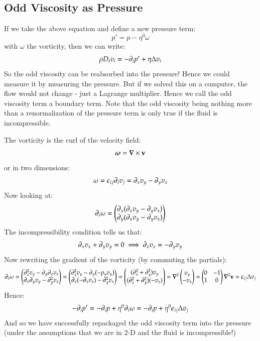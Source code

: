 \subsection{Odd Viscosity as Pressure}
If we take the above equation and define a new pressure term:
\begin{equation}
    p' = p - \eta^0\omega
\end{equation}
with $\omega$ the vorticity, then we can write:
\begin{equation}
    \rho D_t v_i = -\partial_i p' + \eta \Delta v_i
\end{equation}
So the odd viscosity can be reabsorbed into the pressure! Hence we could measure it by measuring the pressure. But if we solved this on a computer, the flow would not change - just a Lagrange multiplier. Hence we call the odd viscosity term a boundary term. Note that the odd viscosity being nothing more than a renormalization of the pressure term is only true if the fluid is incompressible.

The vorticity is the curl of the velocity field:
\begin{equation}
    \gv{\omega} = \nabla \times \v{v}
\end{equation}
or in two dimensions:
\begin{equation}
    \omega = \epsilon_{ij}\partial_i v_j = \partial_x v_y - \partial_y v_x
\end{equation}
Now looking at:
\begin{equation}
    \partial_i \omega = \begin{pmatrix}\partial_x(\partial_x v_y - \partial_y v_x) \\ \partial_y(\partial_x v_y - \partial_y v_x)\end{pmatrix}
\end{equation}
The incompressibility condition tells us that:
\begin{equation}
    \partial_x v_x + \partial_y v_y = 0 \implies \partial_x v_x = -\partial_y v_y
\end{equation}
Now rewriting the gradient of the vorticity (by commuting the partials):
\begin{equation}
    \p_i \omega = \m{\p_x^2 v_y - \p_y \p_x v_x  \\ \p_x \p_y v_y - \p_y^2 v_x} = \m{\p_x^2 v_y - \p_y (-p_y v_y) \\ \p_x (-\p_x v_x) - \p_y^2 v_x} = \m{(\p_x^2 + \p_y^2)v_y \\ (\p_x^2 + \p_y^2)(-v_x)} = \nabla^2 \m{v_y \\ -v_x} = \m{0 & -1 \\ 1 & 0}\nabla^2\v{v} =  \e_{ij}\Delta v_j
\end{equation}
Hence:
\begin{equation}
    -\partial_i p' = -\partial_i p + \eta^0 \partial_i \omega = -\partial_i p + \eta^0 \epsilon_{ij}\Delta v_j
\end{equation}
And so we have successfully repackaged the odd viscosity term into the pressure (under the assumptions that we are in 2-D and the fluid is incompressible!)

